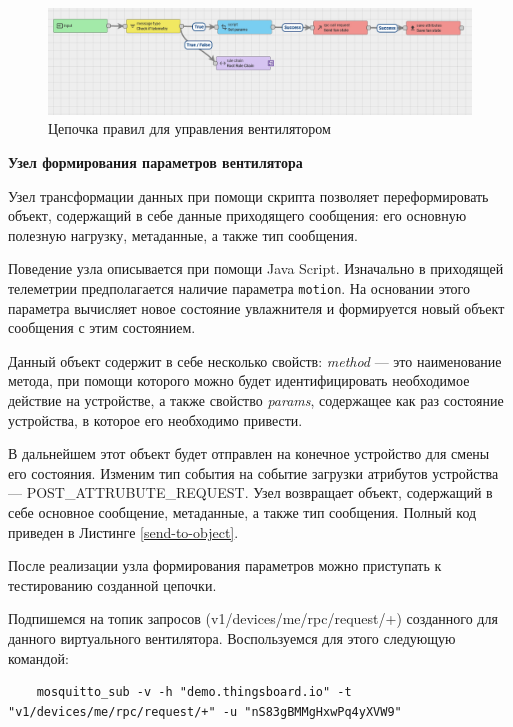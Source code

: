 \documentclass[a4paper,14pt]{extarticle}
\begin{document}
\begin{figure}[h!]
	\centering
	\includegraphics[width=0.6\linewidth]{images/chains}
	\caption{Цепочка правил для управления вентилятором}
	\label{fig:chains}
\end{figure}


\textbf{Узел формирования параметров вентилятора}

Узел трансформации данных при помощи скрипта позволяет переформировать объект,
содержащий в себе данные приходящего сообщения: его основную полезную нагрузку,
метаданные, а также тип сообщения.

Поведение узла описывается при помощи Java Script. Изначально в приходящей телеметрии
предполагается наличие параметра \texttt{motion}. На основании этого параметра
вычисляет новое состояние увлажнителя и формируется новый объект сообщения с этим
состоянием. 

Данный объект содержит в себе несколько свойств: \textit{method} --- это наименование
метода, при помощи которого можно будет идентифицировать необходимое действие на
устройстве, а также свойство \textit{params}, содержащее как раз состояние устройства, в которое
его необходимо привести. 

В дальнейшем этот объект будет отправлен на конечное
устройство для смены его состояния. Изменим тип события на событие загрузки
атрибутов устройства --- POST\_ATTRUBUTE\_REQUEST. Узел возвращает объект, содержащий в себе основное
сообщение, метаданные, а также тип сообщения. Полный код приведен в Листинге \ref{send-to-object}.




После реализации узла формирования параметров можно приступать к тестированию созданной цепочки. 

Подпишемся на топик запросов (v1/devices/me/rpc/request/+) созданного для данного
виртуального вентилятора. Воспользуемся для этого следующую командой:
\begin{lstlisting}
	mosquitto_sub -v -h "demo.thingsboard.io" -t "v1/devices/me/rpc/request/+" -u "nS83gBMMgHxwPq4yXVW9"
\end{lstlisting}
\end{document}
